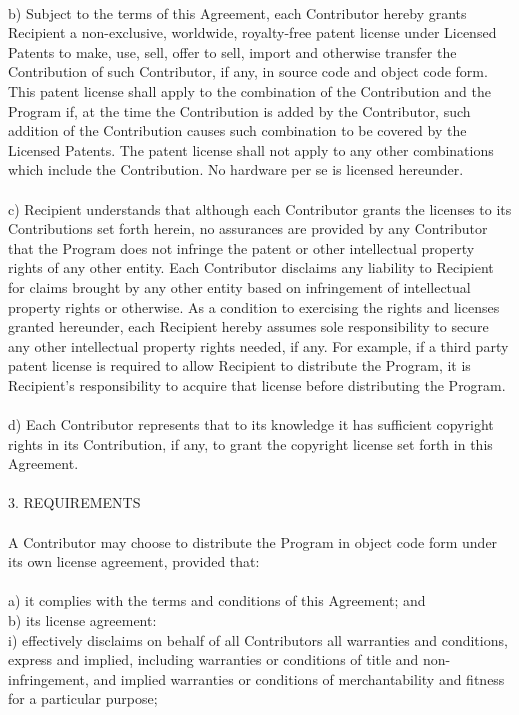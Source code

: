 \documentclass[a4paper, 12pt]{book}
\begin{document}
{\\
b) Subject to the terms of this Agreement, each Contributor hereby grants Recipient a non-exclusive, worldwide, royalty-free patent license under Licensed Patents to make, use, sell, offer to sell, import and otherwise transfer the Contribution of such Contributor, if any, in source code and object code form. This patent license shall apply to the combination of the Contribution and the Program if, at the time the Contribution is added by the Contributor, such addition of the Contribution causes such combination to be covered by the Licensed Patents. The patent license shall not apply to any other combinations which include the Contribution. No hardware per se is licensed hereunder.\\
\\
c) Recipient understands that although each Contributor grants the licenses to its Contributions set forth herein, no assurances are provided by any Contributor that the Program does not infringe the patent or other intellectual property rights of any other entity. Each Contributor disclaims any liability to Recipient for claims brought by any other entity based on infringement of intellectual property rights or otherwise. As a condition to exercising the rights and licenses granted hereunder, each Recipient hereby assumes sole responsibility to secure any other intellectual property rights needed, if any. For example, if a third party patent license is required to allow Recipient to distribute the Program, it is Recipient's responsibility to acquire that license before distributing the Program.\\
\\
d) Each Contributor represents that to its knowledge it has sufficient copyright rights in its Contribution, if any, to grant the copyright license set forth in this Agreement.\\
\\
3. REQUIREMENTS\\
\\
A Contributor may choose to distribute the Program in object code form under its own license agreement, provided that:\\
\\
a) it complies with the terms and conditions of this Agreement; and\\
b) its license agreement:\\
i) effectively disclaims on behalf of all Contributors all warranties and conditions, express and implied, including warranties or conditions of title and non-infringement, and implied warranties or conditions of merchantability and fitness for a particular purpose;\\
}
\end{document}
